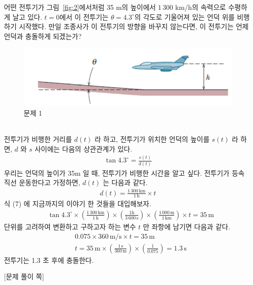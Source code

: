 \documentclass[APS,floatfix,nofootinbib,superscriptaddress,fleqn,preprint]{revtex4}
\begin{document}
\newpage 

어떤 전투기가 그림~\ref{fig:2}에서처럼
35 m의 높이에서 $1\,300$ km/h의 속력으로 수평하게 날고 있다. $t=0$에서
이 전투기는 $\theta=4.3^\circ$의 각도로 기울어져 있는 언덕 위를
비행하기 시작했다. 만일 조종사가 이 전투기의 방향을 바꾸지 않는다면,
이 전투기는 언제 언덕과 충돌하게 되겠는가? 
\begin{figure}[ht]
  \centering
\includegraphics[scale=1.0]{Qfig3-2.pdf}  
  \caption{문제 1}
  \label{fig:1}
\end{figure} \\
전투기가 비행한 거리를 $d(t)$ 라 하고, 전투기가 위치한 언덕의 높이를 $s(t)$ 라 하면, $d$ 와 $s$ 사이에는 다음의 상관관계가 있다.
\begin{align}
  \tan{4.3^\circ} =\frac{s(t)}{d(t)} 
\end{align}
우리는 언덕의 높이가 35m 일 때, 전투기가 비행한 시간을 알고 싶다. 전투기가 등속 직선 운동한다고 가정하면, $d(t)$ 는 다음과 같다.
\begin{align}
  d(t) = \frac{1\,300\,\mathrm{km}}{1\,\mathrm{h}}\times t
\end{align}
식 (7) 에 지금까지의 이야기 한 것들을 대입해보자.
\begin{align}
  &\tan{4.3^\circ} \times \left(\frac{1\,300\,\mathrm{km}}{1\,\mathrm{h}}\right) \times \left(\frac{1\mathrm{h}}{3\,600\,\mathrm{s}}\right) \times \left(\frac{1\,000\,\mathrm{m}}{1\,\mathrm{km}}\right) \times t = 35\,\mathrm{m}
\end{align}
단위를 고려하여 변환하고 구하고자 하는 변수 $t$ 만 좌항에 남기면 다음과 같다.
\begin{align}    
  &0.075\times 360\,\mathrm{m/s}\times t = 35\,\mathrm{m} \\
  &t=35\,\mathrm{m}\times\left(\frac{1\,\mathrm{s}}{360\,\mathrm{m}}\right) \times \left(\frac{1}{0.075}\right) = 1.3\,\mathrm{s}
\end{align}
전투기는 1.3 초 후에 충돌한다.
\newpage

{\color{gray} [문제 풀이 쪽]}

\newpage
\end{document}
